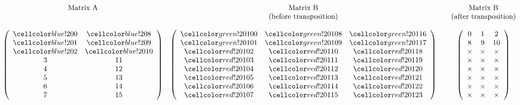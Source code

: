 \begin{minipage}{\linewidth}
\begin{align*}
\begin{matrix}
\textrm{Matrix A} & \textrm{Matrix B}  & & \textrm{Matrix B}\\
&\textrm{(before transposition)}&&\textrm{(after transposition)}\\
\\
\left(\begin{array}{cc}
\colSrc 0 & \colSrc 8\\
\colSrc 1 & \colSrc 9\\
\colSrc 2 & \colSrc 10\\
3 & 11\\
4 & 12\\
5 & 13\\
6 & 14\\
7 & 15
\end{array}\right) 
&
\left(\begin{array}{ccc}
\colTgt 100 & \colTgt 108 & \colTgt 116\\
\colTgt 101 & \colTgt 109 & \colTgt 117\\
\colOwr 102 & \colOwr 110 & \colOwr 118\\
\colOwr 103 & \colOwr 111 & \colOwr 119\\
\colOwr 104 & \colOwr 112 & \colOwr 120\\
\colOwr 105 & \colOwr 113 & \colOwr 121\\
\colOwr 106 & \colOwr 114 & \colOwr 122\\
\colOwr 107 & \colOwr 115 & \colOwr 123
\end{array}\right) 
&&
\left(\begin{array}{ccc}
0      & 1      & 2\\
8      & 9      & 10\\
\times & \times & \times\\
\times & \times & \times\\
\times & \times & \times\\
\times & \times & \times\\
\times & \times & \times\\
\times & \times & \times\\
\end{array}\right) 
\end{matrix}
\end{align*}
\end{minipage}


